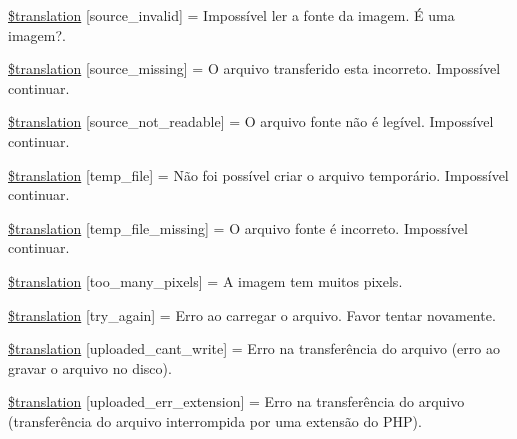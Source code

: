\begin{DoxyCompactItemize}
\item 
\hyperlink{class_8upload_8pt___b_r_8php_a6ab0a660b457eaf2d3434b225449fdd6}{\$translation} \mbox{[}\textquotesingle{}source\+\_\+invalid\textquotesingle{}\mbox{]} = \textquotesingle{}Impossível ler a fonte da imagem. É uma imagem?.\textquotesingle{}
\item 
\hyperlink{class_8upload_8pt___b_r_8php_aceaaf7355acaaf10f0ae60378d03c468}{\$translation} \mbox{[}\textquotesingle{}source\+\_\+missing\textquotesingle{}\mbox{]} = \textquotesingle{}O arquivo transferido esta incorreto. Impossível continuar.\textquotesingle{}
\item 
\hyperlink{class_8upload_8pt___b_r_8php_a922967ca2df0efdd455261142d8e5715}{\$translation} \mbox{[}\textquotesingle{}source\+\_\+not\+\_\+readable\textquotesingle{}\mbox{]} = \textquotesingle{}O arquivo fonte não é legível. Impossível continuar.\textquotesingle{}
\item 
\hyperlink{class_8upload_8pt___b_r_8php_a2baece8da11e20d45175db91851ec3e3}{\$translation} \mbox{[}\textquotesingle{}temp\+\_\+file\textquotesingle{}\mbox{]} = \textquotesingle{}Não foi possível criar o arquivo temporário. Impossível continuar.\textquotesingle{}
\item 
\hyperlink{class_8upload_8pt___b_r_8php_ab0fa87a88aba2624004581eed0633325}{\$translation} \mbox{[}\textquotesingle{}temp\+\_\+file\+\_\+missing\textquotesingle{}\mbox{]} = \textquotesingle{}O arquivo fonte é incorreto. Impossível continuar.\textquotesingle{}
\item 
\hyperlink{class_8upload_8pt___b_r_8php_aa4051ef64e94a3f8295c63cf85544016}{\$translation} \mbox{[}\textquotesingle{}too\+\_\+many\+\_\+pixels\textquotesingle{}\mbox{]} = \textquotesingle{}A imagem tem muitos pixels.\textquotesingle{}
\item 
\hyperlink{class_8upload_8pt___b_r_8php_a3afc377bd803683314f413a814243066}{\$translation} \mbox{[}\textquotesingle{}try\+\_\+again\textquotesingle{}\mbox{]} = \textquotesingle{}Erro ao carregar o arquivo. Favor tentar novamente.\textquotesingle{}
\item 
\hyperlink{class_8upload_8pt___b_r_8php_af368fee3b41bc05e6b208c1557a00c00}{\$translation} \mbox{[}\textquotesingle{}uploaded\+\_\+cant\+\_\+write\textquotesingle{}\mbox{]} = \textquotesingle{}Erro na transferência do arquivo (erro ao gravar o arquivo no disco).\textquotesingle{}
\item 
\hyperlink{class_8upload_8pt___b_r_8php_a01c69a4c8556602b3892dce727bace11}{\$translation} \mbox{[}\textquotesingle{}uploaded\+\_\+err\+\_\+extension\textquotesingle{}\mbox{]} = \textquotesingle{}Erro na transferência do arquivo (transferência do arquivo interrompida por uma extensão do P\+H\+P).\textquotesingle{}

\end{DoxyCompactItemize}
